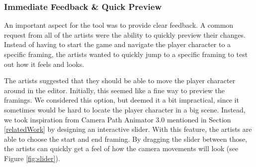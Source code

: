 
\subsubsection{Immediate Feedback \& Quick Preview}
An important aspect for the tool was to provide clear feedback. A common request from all of the artists were the ability to quickly preview their changes. Instead of having to start the game and navigate the player character to a specific framing, the artists wanted to quickly jump to a specific framing to test out how it feels and looks.

The artists suggested that they should be able to move the player character around in the editor. Initially, this seemed like a fine way to preview the framings. We considered this option, but deemed it a bit impractical, since it sometimes would be hard to locate the player character in a big scene. Instead, we took inspiration from Camera Path Animator 3.0 mentioned in Section \ref{relatedWork} by designing an interactive slider. With this feature, the artists are able to choose the start and end framing. By dragging the slider between those, the artists can quickly get a feel of how the camera movements will look (see Figure \ref{fig:slider}).


